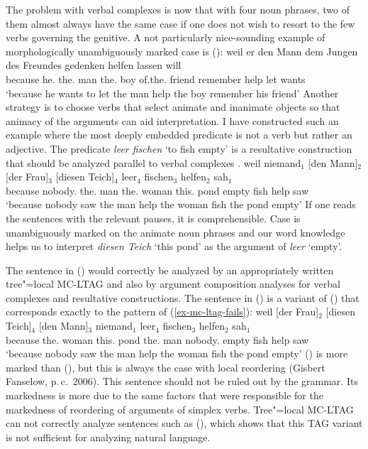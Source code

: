 The problem with verbal complexes is now that with four noun phrases, two of them almost always have the same case if one does not wish to
resort to the few verbs governing the genitive. A not particularly nice-sounding example of morphologically unambiguously marked case
is ():
\ea
\gll weil    er        den        Mann dem        Jungen des Freundes gedenken helfen lassen will\\
     because he.\nom{} the.\acc{} man  the.\dat{} boy    of.the.\gen{} friend remember help let wants\\
\glt `because he wants to let the man help the boy remember his friend'
\z
Another strategy is to choose verbs that select animate and inanimate objects so that animacy of the arguments can aid interpretation.
I have constructed such an example where the most deeply embedded predicate is not a verb but rather an adjective. The predicate \emph{leer fischen}
`to fish empty' is a resultative construction that should be analyzed parallel to verbal complexes \citep[Chapter~5]{Mueller2002b}.
\ea
\gll weil niemand$_1$ [den Mann]$_2$ [der Frau]$_3$ [diesen Teich]$_4$  leer$_4$ fischen$_3$ helfen$_2$ sah$_1$\\
     because nobody.\nom{} \spacebr{}the.\acc{} man \spacebr{}the.\dat{} woman \spacebr{}this.\acc{} pond empty fish help saw\\
\glt `because nobody saw the man help the woman fish the pond empty'
\z
If one reads the sentences with the relevant pauses, it is comprehensible. Case is unambiguously marked on the animate
noun phrases and our word knowledge helps us to interpret \emph{diesen Teich} `this pond' as the argument of \emph{leer} `empty'.  

The sentence in () would correctly be analyzed by an appropriately written tree"=local MC-LTAG and also by argument composition
analyses for verbal complexes and resultative constructions. The sentence in () is a variant of () that corresponds exactly
to the pattern of (\ref{ex-mc-ltag-fails}):
\ea
\gll weil [der Frau]$_2$ [diesen Teich]$_4$ [den Mann]$_3$ niemand$_1$ leer$_4$ fischen$_3$ helfen$_2$ sah$_1$\\
	 because \spacebr{}the.\dat{} woman \spacebr{}this.\acc{} pond \spacebr{}the.\acc{} man nobody.\nom{} empty fish help saw\\
\glt `because nobody saw the man help the woman fish the pond empty'
\z
() is more marked than (), but this is always the case with local reordering (Gisbert
Fanselow, p.\,c.\ 2006).
This sentence should not be ruled out by the grammar. Its markedness is more due to the same factors that were responsible for the markedness of reordering
of arguments of simplex verbs. Tree"=local MC-LTAG can not correctly analyze sentences such as (), which shows that this TAG variant is not
sufficient for analyzing natural language.

